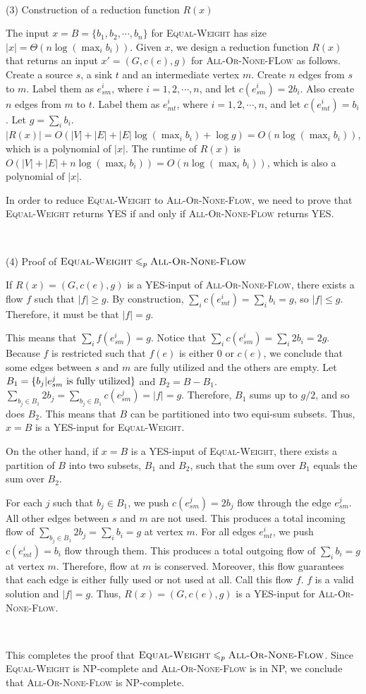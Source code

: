 \documentclass{article}
\begin{document}
~

\noindent(3) Construction of a reduction function $R(x)$

The input $x=B=\{b_1,b_2,\cdots,b_n\}$ for \textsc{Equal-Weight} has size $|x|=\Theta(n\log(\max_ib_i))$. Given $x$, we design a reduction function $R(x)$ that returns an input $x'=(G,c(e),g)$ for \textsc{All-Or-None-FLow} as follows. Create a source $s$, a sink $t$ and an intermediate vertex $m$. Create $n$ edges from $s$ to $m$. Label them as $e_{sm}^i$, where $i=1,2,\cdots,n$, and let $c(e_{sm}^i)=2b_i$. Also create $n$ edges from $m$ to $t$. Label them as $e_{mt}^i$, where $i=1,2,\cdots,n$, and let $c(e_{mt}^i)=b_i$. Let $g=\sum_ib_i$. $|R(x)|=O(|V|+|E|+|E|\log(\max_ib_i)+\log g)=O(n\log(\max_ib_i))$, which is a polynomial of $|x|$. The runtime of $R(x)$ is $O(|V|+|E|+n\log(\max_ib_i))=O(n\log(\max_ib_i))$, which is also a polynomial of $|x|$.

In order to reduce \textsc{Equal-Weight} to \textsc{All-Or-None-Flow}, we need to prove that \textsc{Equal-Weight} returns YES if and only if \textsc{All-Or-None-Flow} returns YES.

~

\noindent(4) Proof of $\textsc{Equal-Weight}\leqslant_p\textsc{All-Or-None-Flow}$

If $R(x)=(G,c(e),g)$ is a YES-input of \textsc{All-Or-None-Flow}, there exists a flow $f$ such that $|f|\geqslant g$. By construction, $\sum_ic(e_{mt}^i)=\sum_ib_i=g$, so $|f|\leqslant g$. Therefore, it must be that $|f|=g$.

This means that $\sum_if(e_{sm}^i)=g$. Notice that $\sum_ic(e_{sm}^i)=\sum_i2b_i=2g$. Because $f$ is restricted such that $f(e)$ is either 0 or $c(e)$, we conclude that some edges between $s$ and $m$ are fully utilized and the others are empty. Let $B_1=\{b_j|e_{sm}^j\textup{ is fully utilized}\}$ and $B_2=B-B_1$. $\sum_{b_j\in B_1}2b_j=\sum_{b_j\in B_1}c(e_{sm}^j)=|f|=g$. Therefore, $B_1$ sums up to $g/2$, and so does $B_2$. This means that $B$ can be partitioned into two equi-sum subsets. Thus, $x=B$ is a YES-input for \textsc{Equal-Weight}.

On the other hand, if $x=B$ is a YES-input of \textsc{Equal-Weight}, there exists a partition of $B$ into two subsets, $B_1$ and $B_2$, such that the sum over $B_1$ equals the sum over $B_2$.

For each $j$ such that $b_j\in B_1$, we push $c(e_{sm}^j)=2b_j$ flow through the edge $e_{sm}^j$. All other edges between $s$ and $m$ are not used. This produces a total incoming flow of $\sum_{b_j\in B_1}2b_j=\sum_ib_i=g$ at vertex $m$. For all edges $e_{mt}^i$, we push $c(e_{mt}^i)=b_i$ flow through them. This produces a total outgoing flow of $\sum_ib_i=g$ at vertex $m$. Therefore, flow at $m$ is conserved. Moreover, this flow guarantees that each edge is either fully used or not used at all. Call this flow $f$. $f$ is a valid solution and $|f|=g$. Thus, $R(x)=(G,c(e),g)$ is a YES-input for \textsc{All-Or-None-Flow}.

~

This completes the proof that $\textsc{Equal-Weight}\leqslant_p\textsc{All-Or-None-Flow}$. Since \textsc{Equal-Weight} is NP-complete and \textsc{All-Or-None-Flow} is in NP, we conclude that \textsc{All-Or-None-Flow} is NP-complete.
\end{document}
